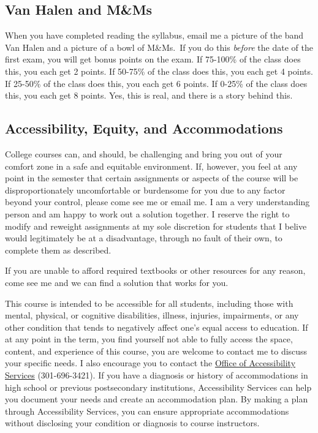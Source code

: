 \documentclass{article}
\begin{document}
\hypertarget{van-halen-and-mms}{%
\subsection*{Van Halen and M\&Ms}\label{van-halen-and-mms}}

When you have completed reading the syllabus, email me a picture of the
band Van Halen and a picture of a bowl of M\&Ms.~If you do this
\emph{before} the date of the first exam, you will get bonus points on
the exam. If 75-100\% of the class does this, you each get 2 points. If
50-75\% of the class does this, you each get 4 points. If 25-50\% of the
class does this, you each get 6 points. If 0-25\% of the class does
this, you each get 8 points. Yes, this is real, and there is a story
behind this.

\hypertarget{accessibility-equity-and-accommodations}{%
\subsection*{Accessibility, Equity, and
Accommodations}\label{accessibility-equity-and-accommodations}}

College courses can, and should, be challenging and bring you out of
your comfort zone in a safe and equitable environment. If, however, you
feel at any point in the semester that certain assignments or aspects of
the course will be disproportionately uncomfortable or burdensome for
you due to any factor beyond your control, please come see me or email
me. I am a very understanding person and am happy to work out a solution
together. I reserve the right to modify and reweight assignments at my
sole discretion for students that I belive would legitimately be at a
disadvantage, through no fault of their own, to complete them as
described.

If you are unable to afford required textbooks or other resources for
any reason, come see me and we can find a solution that works for you.

This course is intended to be accessible for all students, including
those with mental, physical, or cognitive disabilities, illness,
injuries, impairments, or any other condition that tends to negatively
affect one's equal access to education. If at any point in the term, you
find yourself not able to fully access the space, content, and
experience of this course, you are welcome to contact me to discuss your
specific needs. I also encourage you to contact the
\href{https://www.hood.edu/academics/josephine-steiner-center-academic-achievement-retention/accessibility-services}{Office
of Accessibility Services} (301-696-3421). If you have a diagnosis or
history of accommodations in high school or previous postsecondary
institutions, Accessibility Services can help you document your needs
and create an accommodation plan. By making a plan through Accessibility
Services, you can ensure appropriate accommodations without disclosing
your condition or diagnosis to course instructors.
\end{document}
